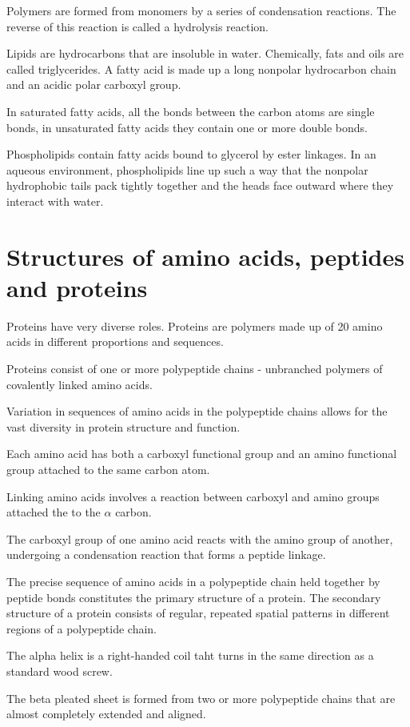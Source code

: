 \documentclass[../bio.tex]{subfiles}
\begin{document}
Polymers are formed from monomers by a series of condensation reactions.
The reverse of this reaction is called a hydrolysis reaction.

Lipids are hydrocarbons that are insoluble in water. 
Chemically, fats and oils are called triglycerides.
A fatty acid is made up a long nonpolar hydrocarbon chain and an acidic polar carboxyl group.

In saturated fatty acids, all the bonds between the carbon atoms are single bonds, in unsaturated fatty acids they contain one or more double bonds.

Phospholipids contain fatty acids bound to glycerol by ester linkages. In an aqueous environment, phospholipids line up such a way that 
the nonpolar hydrophobic tails pack tightly together and the heads face outward where they interact with water. 

\section{Structures of amino acids, peptides and proteins}
Proteins have very diverse roles. Proteins are polymers made up of 20 amino acids in different proportions and sequences.

Proteins consist of one or more polypeptide chains - unbranched polymers of covalently linked amino acids.

Variation in sequences of amino acids in the polypeptide chains allows for the vast diversity in protein structure and function.

Each amino acid has both a carboxyl functional group and an amino functional group attached to the same carbon atom.

Linking amino acids involves a reaction between carboxyl and amino groups attached the to the $\alpha$ carbon.

The carboxyl group of one amino acid reacts with the amino group of another, undergoing a condensation reaction that forms a peptide linkage.

The precise sequence of amino acids in a polypeptide chain held together by peptide bonds constitutes the primary structure of a protein. The secondary
structure of a protein consists of regular, repeated spatial patterns in different regions of a polypeptide chain.

The alpha helix is a right-handed coil taht turns in the same direction as a standard wood screw. 

The beta pleated sheet is formed from two or more polypeptide chains that are almost completely extended and aligned.
\end{document}
